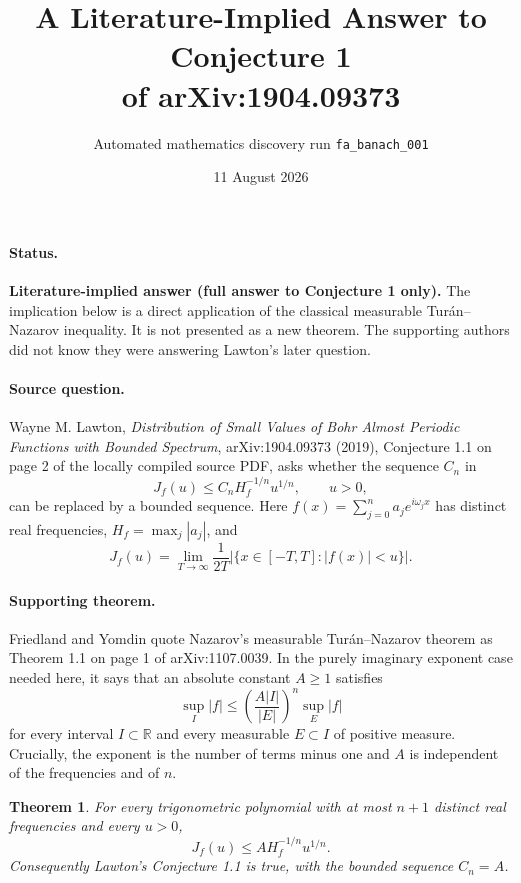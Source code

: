\documentclass[11pt]{article}
\title{A Literature-Implied Answer to Conjecture 1\\
of arXiv:1904.09373}
\author{Automated mathematics discovery run \texttt{fa\_banach\_001}}
\date{11 August 2026}
\newtheorem{theorem}{Theorem}
\newcommand{\R}{\mathbb R}
\begin{document}
\maketitle

\paragraph{Status.}
\textbf{Literature-implied answer (full answer to Conjecture 1 only).}
The implication below is a direct application of the classical measurable
Tur\'an--Nazarov inequality.  It is not presented as a new theorem.  The
supporting authors did not know they were answering Lawton's later question.

\paragraph{Source question.}
Wayne M. Lawton, \emph{Distribution of Small Values of Bohr Almost Periodic
Functions with Bounded Spectrum}, arXiv:1904.09373 (2019), Conjecture 1.1 on
page 2 of the locally compiled source PDF, asks whether the sequence $C_n$ in
\begin{equation}\label{lawton}
 J_f(u)\le C_n H_f^{-1/n}u^{1/n},\qquad u>0,
\end{equation}
can be replaced by a bounded sequence.  Here
$f(x)=\sum_{j=0}^{n}a_j e^{i\omega_jx}$ has distinct real frequencies,
$H_f=\max_j|a_j|$, and
\[
 J_f(u)=\lim_{T\to\infty}\frac{1}{2T}
 \bigl|\{x\in[-T,T]:|f(x)|<u\}\bigr|.
\]

\paragraph{Supporting theorem.}
Friedland and Yomdin quote Nazarov's measurable Tur\'an--Nazarov theorem as
Theorem 1.1 on page 1 of arXiv:1107.0039.  In the purely imaginary exponent
case needed here, it says that an absolute constant $A\ge1$ satisfies
\begin{equation}\label{TN}
 \sup_I|f|\le
 \left(\frac{A|I|}{|E|}\right)^n\sup_E|f|
\end{equation}
for every interval $I\subset\R$ and every measurable $E\subset I$ of
positive measure.  Crucially, the exponent is the number of terms minus one
and $A$ is independent of the frequencies and of $n$.

\begin{theorem}
For every trigonometric polynomial with at most $n+1$ distinct real
frequencies and every $u>0$,
\[
 J_f(u)\le A H_f^{-1/n}u^{1/n}.
\]
Consequently Lawton's Conjecture 1.1 is true, with the bounded sequence
$C_n=A$.
\end{theorem}
\end{document}
